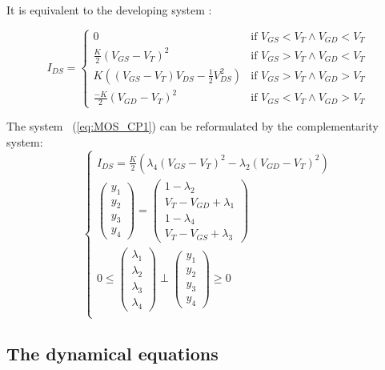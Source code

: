 \documentclass{article}
\def\geq{\geqslant}
\def\leq{\leqslant}
\begin{document}
It is equivalent to the developing system :
  
\[I_{DS}= \left\{ \begin{array}{ll}
0 & \textrm{if $V_{GS} < V_T \wedge V_{GD} < V_T$}\\
\frac{K}{2}(V_{GS}-V_T)^2 & \textrm{if $V_{GS} > V_T \wedge V_{GD} < V_T$}\\
K((V_{GS}-V_T)V_{DS} -\frac{1}{2}V_{DS}^2) & \textrm{if $V_{GS} > V_T \wedge V_{GD} > V_T$}\\
\frac{-K}{2}(V_{GD}-V_T)^2 & \textrm{if $V_{GS} < V_T \wedge V_{GD} > V_T$}
\end{array} \right.\]

The system ~(\ref{eq:MOS_CP1}) can be reformulated by the complementarity system:
  \begin{equation}
    \label{eq:MOS_CP3}
    \left\{\begin{array}{c}

I_{DS}= \frac{K}{2}( \lambda _4 (V_{GS}-V_T)^2 - \lambda _2 (V_{GD}-V_T)^2)\\
\left(\begin{array}{c} y_1\\y_2\\y_3\\y_4\end{array}\right) = \left(\begin{array}{c} 1 - \lambda _2\\V_T-V_{GD} + \lambda _1\\1-\lambda _4\\V_T-V_{GS} + \lambda
  _3\end{array}\right)\\
 0 \leq \left(\begin{array}{c} \lambda _1\\ \lambda _2\\ \lambda _3\\ \lambda _4\end{array}\right) \perp \left(\begin{array}{c}
    y_1\\y_2\\y_3\\y_4\end{array}\right) \geq 0 \\
          \end{array}\right.
  \end{equation}


\subsection{The dynamical equations}
\label{section22}
\end{document}
